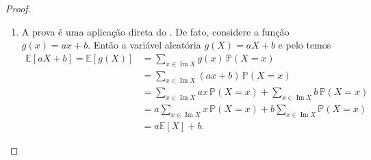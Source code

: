 \documentclass[12pt,portuguese]{article}
\theoremstyle{definition}
\begin{document}
\begin{proof}
\begin{enumerate}[label=(\alph*)]
Como cada parcela da série acima é não-negativa e o somatório inteiro é zero, então
concluímos que todas as parcelas
devem ser nulas. Portanto $\mathbb{P}(X=x)=0$, para todo $x>0$. Usando este fato e lembrando que 
$\mathbb{P}(X=x)=0$, para todo $x<0$ e que 
\begin{align*}
\Omega 
= 
\{X=0\} 
\cup \left( \bigcup_{\substack{ x \in \operatorname{Im} X \\ x> 0 } } \{X=x\} \right)
\cup \left( \bigcup_{\substack{ x \in \operatorname{Im} X \\ x< 0 } } \{X=x\} \right)
\end{align*}
Concluímos do fato dos conjuntos acima serem dois-a-dois disjuntos e da $\sigma$-aditividade 
da medida $\mathbb{P}$ que  
\begin{align*}
1=\mathbb{P}(\Omega)
&= 
\mathbb{P}(X=0)+
\mathbb{P} \left( \bigcup_{\substack{ x \in \operatorname{Im} X \\ x> 0 } } \{X=x\} \right)
+
\mathbb{P}\left( \bigcup_{\substack{ x \in \operatorname{Im} X \\ x< 0 } } \{X=x\} \right)
\\[0.6cm]
&=
\mathbb{P}(X=0)+
\sum_{\substack{ x \in \operatorname{Im} X \\ x> 0 } } \mathbb{P}(X=x)
+
\sum_{\substack{ x \in \operatorname{Im} X \\ x< 0 } } \mathbb{P}(X=x)
\\[0.6cm]
&=
\mathbb{P}(X=0).
\end{align*}
O que prova a afirmação. 

\item A prova é uma aplicação direta do . De fato, considere a função
\(g(x) = ax + b\). Então a variável aleatória $g(X)=aX+b$ e pelo  temos
\begin{align*}
\mathbb{E}[aX+b] = \mathbb{E}[g(X)] 
&= \sum_{ x\in \operatorname{Im} X} g(x)\, \mathbb{P}(X=x)
\\[0.3cm]
&= 
\sum_{ x\in \operatorname{Im} X} (ax+b)\, \mathbb{P}(X=x)
\\[0.3cm]
&= 
\sum_{ x\in \operatorname{Im} X} ax\, \mathbb{P}(X=x)
+ \sum_{ x\in \operatorname{Im} X} b\, \mathbb{P}(X=x)
\\[0.3cm]
&=
a\sum_{ x\in \operatorname{Im} X} x\, \mathbb{P}(X=x)
+b \sum_{ x\in \operatorname{Im} X} \mathbb{P}(X=x)
\\[0.3cm]
&=
a\mathbb{E}[X]+ b.
\end{align*}
\end{enumerate}
\end{proof}
\end{document}

